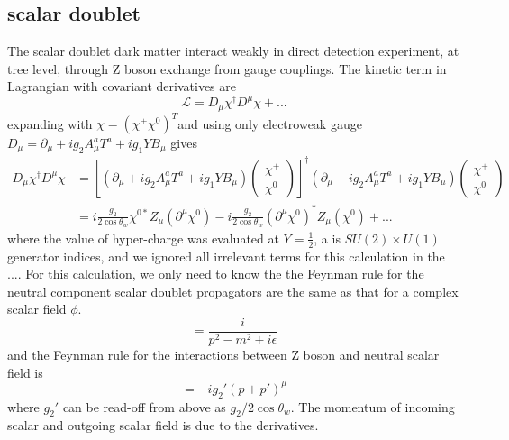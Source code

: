 \documentclass[12pt]{article}
\begin{document}
\subsection{scalar doublet}
The scalar doublet dark matter interact weakly in direct detection experiment, at tree level, through Z boson exchange from gauge couplings. 
The kinetic term in Lagrangian with covariant derivatives are 
$$
\mathcal L = D_\mu \chi ^\dagger D^\mu \chi + ...
$$
expanding with $\chi = ( \chi^+ \chi^0 )^T $and using only electroweak gauge 
$D_\mu = \partial_\mu + ig_2 A_\mu^a T^a + ig_1 Y B_\mu $
gives
\begin{equation}
\begin{aligned}
 D_\mu \chi ^\dagger D^\mu \chi 
 &= [(\partial_\mu + ig_2 A_\mu^a T^a + ig_1 Y B_\mu) \begin{pmatrix}
\chi^+  \\   
\chi^0
\end{pmatrix}
]^ \dagger
 (\partial_\mu + ig_2 A_\mu^a T^a + ig_1 Y B_\mu) \begin{pmatrix}
\chi^+  \\ \chi^0
\end{pmatrix}\\
&= i  \frac{g_2}{2\cos \theta_w}\chi^{0*} Z_\mu (\partial^\mu \chi^0 ) - i  \frac{g_2}{2\cos\theta_w} (\partial^\mu \chi^0 )^*Z_\mu ( \chi^0 ) + ...
\end{aligned}
\end{equation}
where the value of hyper-charge was evaluated at $Y=\frac{1}{2}$, a is $SU(2) \times U(1) $ generator indices, and we ignored all irrelevant terms for this calculation in the .... 
For this calculation, we only need to know the the Feynman rule for the neutral component scalar doublet propagators are the same as that for a complex scalar field $\phi$. 
$$
= \frac{i}{p^2 - m^2 +i \epsilon}
$$
and the Feynman rule for the interactions between Z boson and neutral scalar field is 
$$
= - i g_2' (p+p')^\mu
$$
where $g_2' $ can be read-off from above as $g_2 / 2\cos \theta_w$. The momentum of incoming scalar and outgoing scalar field is due to the derivatives.  
\end{document}
